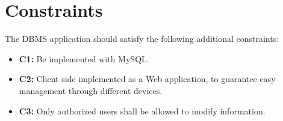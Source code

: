 \section{Constraints}

The DBMS application should satisfy the following additional constraints:

\begin{itemize}
    \item \textbf{C1:} Be implemented with MySQL.
    
    \item \textbf{C2:} Client side implemented as a Web application, to guarantee easy management through different devices.
    
    \item \textbf{C3:} Only authorized users shall be allowed to modify information.


 \end{itemize}
